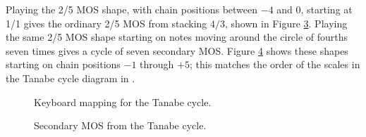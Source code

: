 \documentclass[a4paper,11pt]{article}
\begin{document}
Playing the 2/5 MOS shape, with chain positions between $-4$ and $0$, starting
at 1/1 gives the ordinary 2/5 MOS from stacking $4/3$, shown in Figure
\ref{fig:secondary-mos-keyboards-1}. Playing the same 2/5 MOS shape starting on
notes moving around the circle of fourths seven times gives a cycle of seven
secondary MOS. Figure \ref{fig:secondary-mos-keyboards} shows these shapes
starting on chain positions $-1$ through $+5$; this matches the order of the
scales in the Tanabe cycle diagram in \cite[13]{wilsonmos}.

\begin{figure}

\caption{Keyboard mapping for the Tanabe cycle.}
\label{fig:tanabe-mapping}
\end{figure}

\bgroup
{}
\begin{figure}
\begin{subfigure}{0.5\textwidth}

\vspace{-0.5cm}
\caption{}
\label{fig:secondary-mos-keyboards-0}
\vspace{0.25cm}
\end{subfigure}
\begin{subfigure}{0.5\textwidth}

\vspace{-0.5cm}
\caption{}
\vspace{0.25cm}
\label{fig:secondary-mos-keyboards-1}
\end{subfigure}
\begin{subfigure}{0.5\textwidth}

\vspace{-0.5cm}
\caption{}
\vspace{0.25cm}
\end{subfigure}
\begin{subfigure}{0.5\textwidth}

\vspace{-0.5cm}
\caption{}
\vspace{0.25cm}
\end{subfigure}
\begin{subfigure}{0.5\textwidth}

\vspace{-0.5cm}
\caption{}
\vspace{0.25cm}
\end{subfigure}
\begin{subfigure}{0.5\textwidth}

\vspace{-0.5cm}
\caption{}
\vspace{0.25cm}
\end{subfigure}
\begin{subfigure}{0.5\textwidth}

\vspace{-0.5cm}
\caption{}
\vspace{0.25cm}
\end{subfigure}
\caption{Secondary MOS from the Tanabe cycle.}
\label{fig:secondary-mos-keyboards}
\end{figure}
\egroup
\end{document}
